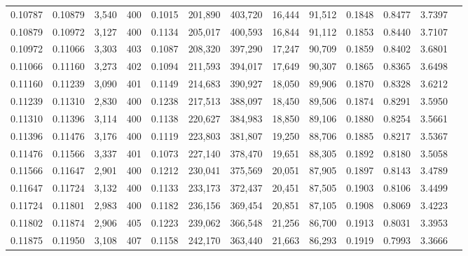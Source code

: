 \begin{tabular}{rrrrrrrrrrrrr}
0.10787 & 0.10879 & 3,540 & 400 &                                     0.1015 & 201,890 & 403,720 &  16,444 &  91,512 & 0.1848 & 0.8477 & 3.7397 \\
0.10879 & 0.10972 & 3,127 & 400 &                                     0.1134 & 205,017 & 400,593 &  16,844 &  91,112 & 0.1853 & 0.8440 & 3.7107 \\
0.10972 & 0.11066 & 3,303 & 403 &                                     0.1087 & 208,320 & 397,290 &  17,247 &  90,709 & 0.1859 & 0.8402 & 3.6801 \\
0.11066 & 0.11160 & 3,273 & 402 &                                     0.1094 & 211,593 & 394,017 &  17,649 &  90,307 & 0.1865 & 0.8365 & 3.6498 \\
0.11160 & 0.11239 & 3,090 & 401 &                                     0.1149 & 214,683 & 390,927 &  18,050 &  89,906 & 0.1870 & 0.8328 & 3.6212 \\
0.11239 & 0.11310 & 2,830 & 400 &                                     0.1238 & 217,513 & 388,097 &  18,450 &  89,506 & 0.1874 & 0.8291 & 3.5950 \\
0.11310 & 0.11396 & 3,114 & 400 &                                     0.1138 & 220,627 & 384,983 &  18,850 &  89,106 & 0.1880 & 0.8254 & 3.5661 \\
0.11396 & 0.11476 & 3,176 & 400 &                                     0.1119 & 223,803 & 381,807 &  19,250 &  88,706 & 0.1885 & 0.8217 & 3.5367 \\
0.11476 & 0.11566 & 3,337 & 401 &                                     0.1073 & 227,140 & 378,470 &  19,651 &  88,305 & 0.1892 & 0.8180 & 3.5058 \\
0.11566 & 0.11647 & 2,901 & 400 &                                     0.1212 & 230,041 & 375,569 &  20,051 &  87,905 & 0.1897 & 0.8143 & 3.4789 \\
0.11647 & 0.11724 & 3,132 & 400 &                                     0.1133 & 233,173 & 372,437 &  20,451 &  87,505 & 0.1903 & 0.8106 & 3.4499 \\
0.11724 & 0.11801 & 2,983 & 400 &                                     0.1182 & 236,156 & 369,454 &  20,851 &  87,105 & 0.1908 & 0.8069 & 3.4223 \\
0.11802 & 0.11874 & 2,906 & 405 &                                     0.1223 & 239,062 & 366,548 &  21,256 &  86,700 & 0.1913 & 0.8031 & 3.3953 \\
0.11875 & 0.11950 & 3,108 & 407 &                                     0.1158 & 242,170 & 363,440 &  21,663 &  86,293 & 0.1919 & 0.7993 & 3.3666 \\

\end{tabular}
